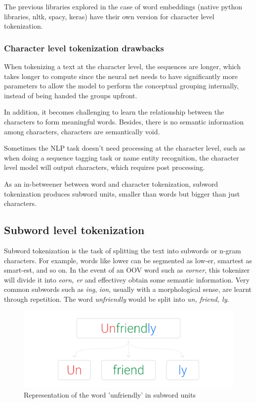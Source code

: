 The previous libraries explored in the case of word embeddings (native python libraries, nltk, spacy, keras) have their own version for character level tokenization.

\subsubsection{Character level tokenization drawbacks}

When tokenizing a text at the character level, the sequences are longer, which takes longer to compute since the neural net needs to have significantly more parameters to allow the model to perform the conceptual grouping internally, instead of being handed the groups upfront.

In addition, it becomes challenging to learn the relationship between the characters to form meaningful words. Besides, there is no semantic information among characters, characters are semantically void.

Sometimes the NLP task doesn't need processing at the character level, such as when doing a sequence tagging task or name entity recognition, the character level model will output characters, which requires post processing.

As an in-betweener between word and character tokenization, subword tokenization produces subword units, smaller than words but bigger than just characters.

\subsection{Subword level tokenization}

Subword tokenization is the task of splitting the text into subwords or n-gram characters. For example, words like lower can be segmented as low-er, smartest as smart-est, and so on. In the event of an OOV word such as \emph{eorner}, this tokenizer will divide it into \emph{eorn, er} and effectivey obtain some semantic information. Very common subwords such as \emph{ing}, \emph{ion}, usually with a morphological sense, are learnt through repetition. The word \emph{unfriendly} would be split into \emph{un, friend, ly}.

\begin{figure}[!ht]
    \centering
    \includegraphics[width=12cm]{figures/subword.png}
    \caption{Representation of the word 'unfriendly' in subword units}
\end{figure}

